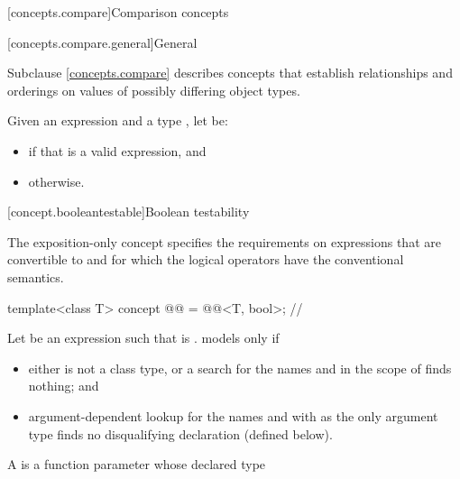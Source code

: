 [concepts.compare]{Comparison concepts}

[concepts.compare.general]{General}

\pnum
Subclause \ref{concepts.compare} describes concepts that establish relationships and orderings
on values of possibly differing object types.

\pnum
Given an expression  and a type ,
let  be:
\begin{itemize}
\item
{} if that is a valid expression, and
\item
{} otherwise.
\end{itemize}

[concept.booleantestable]{Boolean testability}

\pnum
The exposition-only  concept
specifies the requirements on expressions
that are convertible to  and
for which the logical operators
have the conventional semantics.

\begin{itemdecl}
template<class T>
  concept @@ = @@<T, bool>;  // \expos
\end{itemdecl}

\pnum
Let  be an expression such that
 is .
 models  only if

\begin{itemize}
\item
either  is not a class type, or
a search for the names  and 
in the scope of 
finds nothing; and

\item
argument-dependent lookup
for the names  and 
with  as the only argument type
finds no disqualifying declaration (defined below).
\end{itemize}

\pnum
A 
is a function parameter whose declared type 

